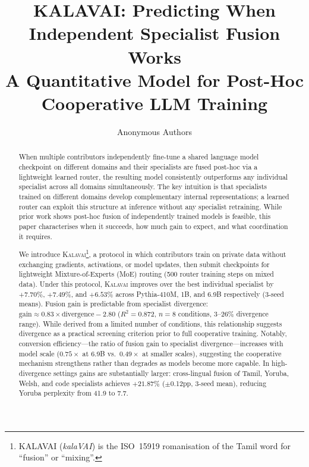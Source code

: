 \documentclass{article}
\title{KALAVAI: Predicting When Independent Specialist Fusion Works\\
       A Quantitative Model for Post-Hoc Cooperative LLM Training}
\author{%
  Anonymous Authors
}
\newcommand{\kalavai}{\textsc{Kalavai}\xspace}
\begin{document}
\maketitle

\begin{abstract}
When multiple contributors independently fine-tune a shared language model checkpoint on
different domains and their specialists are fused post-hoc via a lightweight learned router,
the resulting model consistently outperforms any individual specialist across all domains
simultaneously. The key intuition is that specialists trained on different domains develop
complementary internal representations; a learned router can exploit this structure at
inference without any specialist retraining. While prior work shows post-hoc fusion of independently trained models is feasible, this paper characterises when it succeeds, how much gain to expect, and what coordination it requires.

We introduce \kalavai\footnote{KALAVAI (\textit{kalaVAI}) is the ISO~15919 romanisation of the Tamil word for ``fusion'' or ``mixing''.}, a protocol in which contributors train on private data without
exchanging gradients, activations, or model updates, then submit checkpoints for lightweight
Mixture-of-Experts (MoE) routing (500 router training steps on mixed data). Under this protocol, \kalavai improves
over the best individual specialist by $+7.70\%$, $+7.49\%$, and $+6.53\%$ across Pythia-410M,
1B, and 6.9B respectively (3-seed means). Fusion gain is predictable from specialist
divergence:
$\text{gain} \approx 0.83 \times \text{divergence} - 2.80$
($R^2 = 0.872$, $n{=}8$ conditions, 3--26\% divergence range). While derived from a limited
number of conditions, this relationship suggests divergence as a practical screening criterion
prior to full cooperative training. Notably, conversion efficiency---the ratio of fusion gain to specialist divergence---increases with model scale ($0.75\times$ at 6.9B vs.\ $0.49\times$ at smaller scales), suggesting the cooperative mechanism strengthens rather than degrades as models become more capable. In high-divergence settings gains are substantially
larger: cross-lingual fusion of Tamil, Yoruba, Welsh, and code specialists achieves $+21.87\%$
($\pm$0.12pp, 3-seed mean), reducing Yoruba perplexity from 41.9 to 7.7.


\end{abstract}
\end{document}
